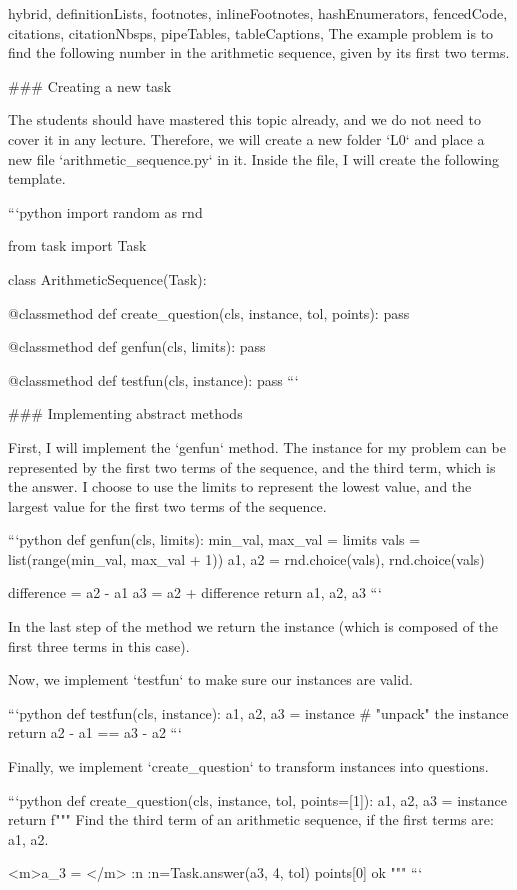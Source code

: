 \documentclass[
  digital, %
  table,   %
  twoside, %
  nolof,     %
  nolot,     %
  draft=false,
  final,
]{fithesis3}
\begin{document}
\begin{markdown*}{%
  hybrid,
  definitionLists,
  footnotes,
  inlineFootnotes,
  hashEnumerators,
  fencedCode,
  citations,
  citationNbsps,
  pipeTables,
  tableCaptions,
}
The example problem is to find the following number in the arithmetic sequence, 
given by its first two terms.

### Creating a new task

The students should have mastered this topic already, and we do not need to cover 
it in any lecture. Therefore, we will create a new folder `L0` and place a new
file `arithmetic_sequence.py` in it. Inside the file, I will create the following template.

```python
import random as rnd

from task import Task

class ArithmeticSequence(Task):

    @classmethod
    def create_question(cls, instance, tol, points):
        pass
    
    @classmethod
    def genfun(cls, limits):
        pass
    
    @classmethod
    def testfun(cls, instance):
        pass
```

### Implementing abstract methods

First, I will implement the `genfun` method. The instance for my problem
can be represented by the first two terms of the sequence, and the third
term, which is the answer. I choose to use the limits to represent the lowest
value, and the largest value for the first two terms of the sequence.

```python
def genfun(cls, limits):
    min_val, max_val = limits
    vals = list(range(min_val, max_val + 1))
    a1, a2 = rnd.choice(vals), rnd.choice(vals)

    difference = a2 - a1
    a3 = a2 + difference
    return a1, a2, a3
```

In the last step of the method we return the instance (which is composed of the
first three terms in this case).

Now, we implement `testfun` to make sure our instances are valid.

```python
def testfun(cls, instance):
    a1, a2, a3 = instance  # "unpack" the instance
    return a2 - a1 == a3 - a2
```

Finally, we implement `create_question` to transform instances
into questions.

```python
def create_question(cls, instance, tol, points=[1]):
    a1, a2, a3 = instance
    return f"""
    Find the third term of an arithmetic sequence, if the first terms 
    are: {a1}, {a2}. 
    
    <m>a_3 = </m> :n
    :n={Task.answer(a3, 4, tol)} {points[0]} ok
    """
```


\end{markdown*}
\end{document}
